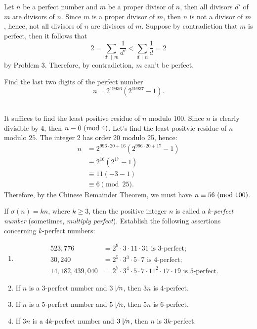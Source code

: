 \begin{solution}
    Let $n$ be a perfect number and $m$ be a proper divisor of $n$, then all divisors $d'$ of $m$ are divisors of $n$. Since $m$ is a proper divisor of $m$, then $n$ is not a divisor of $m$, hence, not all divisors of $n$ are divisors of $m$. Suppose by contradiction that $m$ is perfect, then it follows that
    $$2 = \sum_{d' \, \mid \, m}\frac{1}{d'} < \sum_{d \, \mid \, n}\frac{1}{d} = 2$$
    by Problem 3. Therefore, by contradiction, $m$ can't be perfect. \\
\end{solution}

\begin{exercise}
    Find the last two digits of the perfect number
    $$n = 2^{19936}(2^{19937} - 1).$$ \\
\end{exercise}

\begin{solution}
    It suffices to find the least positive residue of $n$ modulo 100. Since $n$ is clearly divisible by 4, then $n \equiv 0 \ (\mathrm{mod}\ 4)$. Let's find the least positvie residue of $n$ modulo $25$. The integer $2$ has order 20 modulo 25, hence:
    \begin{align*}
        n &= 2^{996\cdot 20 + 16}(2^{996\cdot 20 + 17} - 1) \\
        &\equiv 2^{16}(2^{17} - 1) \\
        &\equiv 11(-3-1) \\
        &\equiv 6 \pmod{25}.
    \end{align*}
    Therefore, by the Chinese Remainder Theorem, we must have $n \equiv 56 \ (\mathrm{mod}\ 100)$. \\
\end{solution}

\begin{exercise}
    If $\sigma(n) = kn$, where $k \geq 3$, then the positive integer $n$ is called a $k$-\textit{perfect number} (sometimes, \textit{multiply perfect}). Establish the following assertions concerning $k$-perfect numbers:
    \begin{enumerate}
        \item \begin{align*}
            523,776 &= 2^9\cdot 3 \cdot 11\cdot 31 \text{ is 3-perfect};\\
            30,240 &= 2^5 \cdot 3^3 \cdot 5 \cdot 7 \text{ is 4-perfect};\\
            14,182,439,040 &= 2^7 \cdot 3^4 \cdot 5 \cdot 7 \cdot 11^2 \cdot 17 \cdot 19 \text{ is 5-perfect}.
        \end{align*}
        \item If $n$ is a 3-perfect number and $3 \not\mid n$, then $3n$ is 4-perfect.
        \item If $n$ is a 5-perfect number and $5 \not\mid n$, then $5n$ is 6-perfect.
        \item If $3n$ is a $4k$-perfect number and $3\not\mid n$, then $n$ is $3k$-perfect.\\
    \end{enumerate}
\end{exercise}

